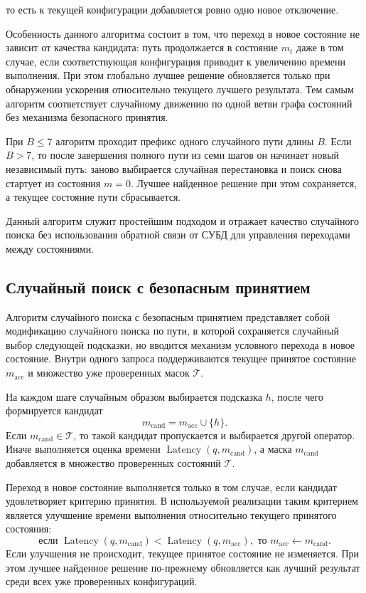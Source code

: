 то есть к текущей конфигурации добавляется ровно одно новое отключение.

Особенность данного алгоритма состоит в том, что переход в новое состояние не зависит от качества кандидата: путь продолжается в состояние \(m_t\) даже в том случае, если соответствующая конфигурация приводит к увеличению времени выполнения. При этом глобально лучшее решение обновляется только при обнаружении ускорения относительно текущего лучшего результата. Тем самым алгоритм соответствует случайному движению по одной ветви графа состояний без механизма безопасного принятия.

При \(B \leq 7\) алгоритм проходит префикс одного случайного пути длины \(B\). Если \(B > 7\), то после завершения полного пути из семи шагов он начинает новый независимый путь: заново выбирается случайная перестановка и поиск снова стартует из состояния \(m=0\). Лучшее найденное решение при этом сохраняется, а текущее состояние пути сбрасывается.

Данный алгоритм служит простейшим подходом и отражает качество случайного поиска без использования обратной связи от СУБД для управления переходами между состояниями.

\subsection{Случайный поиск с безопасным принятием}\label{subsec:ch4_randomsafeaccept}

Алгоритм случайного поиска с безопасным принятием представляет собой модификацию случайного поиска по пути, в которой сохраняется случайный выбор следующей подсказки, но вводится механизм условного перехода в новое состояние. Внутри одного запроса поддерживаются текущее принятое состояние \(m_{\mathrm{acc}}\) и множество уже проверенных масок \(\mathcal{T}\).

На каждом шаге случайным образом выбирается подсказка \(h\), после чего формируется кандидат
\begin{equation}
m_{\mathrm{cand}} = m_{\mathrm{acc}} \cup \{h\}.
\end{equation}
Если \(m_{\mathrm{cand}} \in \mathcal{T}\), то такой кандидат пропускается и выбирается другой оператор. Иначе выполняется оценка времени \(\operatorname{Latency}(q,m_{\mathrm{cand}})\), а маска \(m_{\mathrm{cand}}\) добавляется в множество проверенных состояний \(\mathcal{T}\).

Переход в новое состояние выполняется только в том случае, если кандидат удовлетворяет критерию принятия. В используемой реализации таким критерием является улучшение времени выполнения относительно текущего принятого состояния:
\begin{equation}
\text{если } \operatorname{Latency}(q,m_{\mathrm{cand}}) < \operatorname{Latency}(q,m_{\mathrm{acc}}),
\text{ то } m_{\mathrm{acc}} \leftarrow m_{\mathrm{cand}}.
\end{equation}
Если улучшения не происходит, текущее принятое состояние не изменяется. При этом лучшее найденное решение по-прежнему обновляется как лучший результат среди всех уже проверенных конфигураций.

